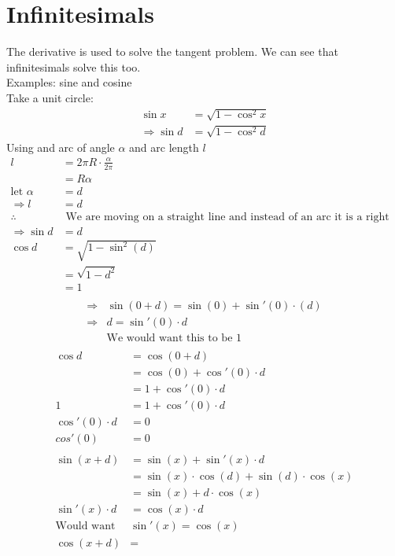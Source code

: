 \documentclass[a4paper,12pt]{article}
\begin{document}
\section*{Infinitesimals}
The derivative is used to solve the tangent problem. We can see that infinitesimals solve this too. \\
Examples: sine and cosine \\
Take a unit circle:
\begin{align*}
\sin x & = \sqrt{1-\cos^2x} \\
\Rightarrow \sin d & = \sqrt{1-\cos^2d}
\end{align*}
Using and arc of angle $\alpha$ and arc length $l$
\begin{align*}
l & = 2 \pi R \cdot \frac{\alpha}{2 \pi} \\
& = R \alpha \\
\text{let } \alpha &= d \\
\Rightarrow l &= d \\
\therefore & \text{ We are moving on a straight line and instead of an arc it is a right angled triangle} \\
\Rightarrow \sin{d} & = d \\
\cos{d} & = \sqrt{1-\sin^2(d)} \\
& = \sqrt{1-d^2} \\
& = 1 \\
\end{align*}
\begin{align*}
\Rightarrow & \sin(0+d) = \sin(0) + \sin'(0) \cdot (d) \\
\Rightarrow & d = \sin'(0) \cdot d \\
&\text{We would want this to be 1} \\
\end{align*}
\begin{align*}
\cos{d} & = \cos(0+d) \\
& = \cos(0) + \cos'(0) \cdot d \\
& = 1 + \cos'(0) \cdot d \\
1 & = 1 + \cos'(0) \cdot d \\
\cos'(0) \cdot d & = 0 \\
cos'(0) &= 0 \\
\\
\sin(x + d)& = \sin(x) + \sin'(x) \cdot d \\
& = \sin(x) \cdot \cos(d) + \sin(d) \cdot \cos(x) \\
& = \sin(x) + d \cdot \cos(x) \\
\sin'(x) \cdot d & = \cos(x) \cdot d \\
\text{Would want } & \sin'(x) = \cos(x) \\
\cos(x+d) & = 
\end{align*}
\end{document}
